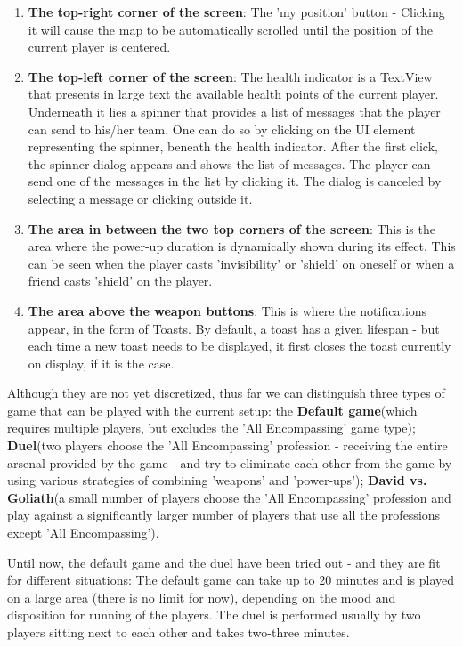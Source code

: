 \begin{enumerate}
  \item\textbf{The top-right corner of the screen}: The 'my position' button - 
  Clicking it will cause the map to be automatically scrolled until the position
  of the current player is centered.
  
  \item\textbf{The top-left corner of the screen}: The health indicator is a
  TextView that presents in large text the available health points of the
  current player. Underneath it lies a spinner that provides a list of messages
  that the player can send to his/her team. One can do so by clicking on the UI
  element representing the spinner, beneath the health indicator. After the
  first click, the spinner dialog appears and shows the list of messages. The
  player can send one of the messages in the list by clicking it. The dialog is
  canceled by selecting a message or clicking outside it.
  
  \item\textbf{The area in between the two top corners of the screen}: This is
  the area where the power-up duration is dynamically shown during its effect.
  This can be seen when the player casts 'invisibility' or 'shield' on oneself
  or when a friend casts 'shield' on the player.
  
  \item\textbf{The area above the weapon buttons}: This is where the
  notifications appear, in the form of Toasts. By default, a toast has a given
  lifespan - but each time a new toast needs to be displayed, it first closes
  the toast currently on display, if it is the case.  
\end{enumerate}

Although they are not yet discretized, thus far we can distinguish three types
of game that can be played with the current setup: the \textbf{Default
game}(which requires multiple players, but excludes the 'All Encompassing' game
type); \textbf{Duel}(two players choose the 'All Encompassing' profession -
receiving the entire arsenal provided by the game - and try to eliminate
each other from the game by using various strategies of combining 'weapons' and
'power-ups'); \textbf{David vs. Goliath}(a small number of players choose the
'All Encompassing' profession and play against a significantly larger number of
players that use all the professions except 'All Encompassing').\newline

Until now, the default game and the duel have been tried out - and they are
fit for different situations: The default game can take up to 20 minutes and is
played on a large area (there is no limit for now), depending on the mood and
disposition for running of the players. The duel is performed usually by two
players sitting next to each other and takes two-three minutes.\newline

